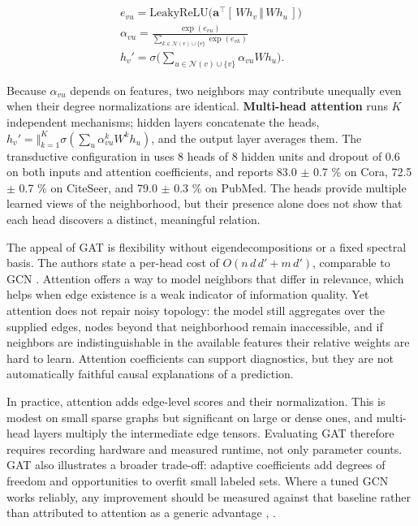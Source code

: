 \documentclass[conference]{IEEEtran}
\begin{document}
\[\begin{gathered}e_{vu} = \mathrm{LeakyReLU}\big(\mathbf{a}^\top[\,W h_v \,\Vert\, W h_u\,]\big) \\ \alpha_{vu} = \frac{\exp(e_{vu})}{\sum_{k\in\mathcal{N}(v)\cup\{v\}}\exp(e_{vk})} \\ h_v' = \sigma\Big(\sum_{u\in\mathcal{N}(v)\cup\{v\}} \alpha_{vu} W h_u\Big).\end{gathered}\tag{7}\]

Because \(\alpha_{vu}\) depends on features, two neighbors may contribute unequally even when their degree normalizations are identical. \textbf{Multi-head attention} runs \(K\) independent mechanisms; hidden layers concatenate the heads, \(h_v' = \Vert_{k=1}^{K}\sigma(\sum_u \alpha_{vu}^{k}W^{k}h_u)\), and the output layer averages them. The transductive configuration in \cite{b3} uses 8 heads of 8 hidden units and dropout of 0.6 on both inputs and attention coefficients, and reports 83.0 \ensuremath{\pm} 0.7 \% on Cora, 72.5 \ensuremath{\pm} 0.7 \% on CiteSeer, and 79.0 \ensuremath{\pm} 0.3 \% on PubMed. The heads provide multiple learned views of the neighborhood, but their presence alone does not show that each head discovers a distinct, meaningful relation.

The appeal of GAT is flexibility without eigendecompositions or a fixed spectral basis. The authors state a per-head cost of \(O(n\,d\,d' + m\,d')\), comparable to GCN \cite{b3}. Attention offers a way to model neighbors that differ in relevance, which helps when edge existence is a weak indicator of information quality. Yet attention does not repair noisy topology: the model still aggregates over the supplied edges, nodes beyond that neighborhood remain inaccessible, and if neighbors are indistinguishable in the available features their relative weights are hard to learn. Attention coefficients can support diagnostics, but they are not automatically faithful causal explanations of a prediction.

In practice, attention adds edge-level scores and their normalization. This is modest on small sparse graphs but significant on large or dense ones, and multi-head layers multiply the intermediate edge tensors. Evaluating GAT therefore requires recording hardware and measured runtime, not only parameter counts. GAT also illustrates a broader trade-off: adaptive coefficients add degrees of freedom and opportunities to overfit small labeled sets. Where a tuned GCN works reliably, any improvement should be measured against that baseline rather than attributed to attention as a generic advantage \cite{b3}, \cite{b5}.
\end{document}

